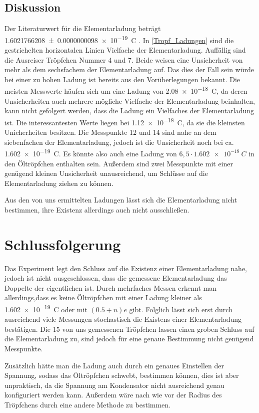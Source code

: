 \documentclass[
	a4paper,
	12pt,
	pagesize,
	ngerman
]{scrartcl}
\begin{document}
	\subsection{Diskussion}
	Der Literaturwert für die Elementarladung beträgt \SI{1,6021766208 \pm 0,0000000098 e-19}{C} \cite{Elementarladung}.
	In \cref{Tropf_Ladungen} sind die gestrichelten horizontalen Linien Vielfache der Elementarladung.
	Auffällig sind die Ausreiser Tröpfchen Nummer 4 und 7. 
	Beide weisen eine Unsicherheit von mehr als dem sechsfachem der Elementarladung auf. 
	Das dies der Fall sein würde bei einer zu hohen Ladung ist bereits aus den Vorüberlegungen bekannt.
	Die meisten Messwerte häufen sich um  eine Ladung von \SI{2,08e-18}{C}, da deren Unsicherheiten auch mehrere mögliche Vielfache der Elementarladung beinhalten, kann nicht gefolgert werden, dass die Ladung ein Vielfaches der Elementarladung ist.
	Die interessantesten Werte liegen bei \SI{1,12e-18}{C}, da sie die kleinsten Unicherheiten besitzen.
	Die Messpunkte 12 und 14 sind nahe an dem siebenfachen der Elementarladung, jedoch ist die Unsicherheit noch bei ca. \SI{1,602e-19}{C}.
	Es könnte also auch eine Ladung von $6,5 \cdot \SI{1,602e-18}{C}$ in den Öltröpfchen enthalten sein.
	Außerdem sind zwei Messpunkte mit einer genügend kleinen Unsicherheit unausreichend, um Schlüsse auf die Elementarladung ziehen zu können.


	Aus den von uns ermittelten Ladungen lässt sich die Elementarladung nicht bestimmen, ihre Existenz allerdings auch nicht ausschließen.

	
	\section{Schlussfolgerung}
	Das Experiment legt den Schluss auf die Existenz einer Elementarladung nahe, jedoch ist nicht ausgeschlossen, dass die gemessene Elementarladung das Doppelte der eigentlichen ist. 
	Durch mehrfaches Messen erkennt man allerdings,dass es keine Öltröpfchen mit einer Ladung kleiner als \SI{1,602e-19}{C} oder mit $(0.5+n)e$ gibt. 
	Folglich lässt sich erst durch ausreichend viele Messungen stochastisch die Existens einer Elementarladung bestätigen.
	Die 15 von uns gemessenen Tröpfchen lassen einen groben Schluss auf die Elementarladung zu, sind jedoch für eine genaue Bestimmung nicht genügend Messpunkte.

	Zusätzlich hätte man die Ladung auch durch ein genaues Einstellen der Spannung, sodass das Öltröpfchen schwebt, bestimmen können, dies ist aber unpraktisch, da die Spannung am Kondensator nicht ausreichend genau konfiguriert werden kann.
	Außerdem wäre nach wie vor der Radius des Tröpfchens durch eine andere Methode zu bestimmen.
\end{document}

